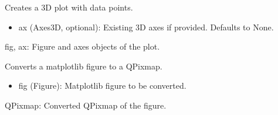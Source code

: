 \documentclass[a4paper,10pt,english]{sphinxmanual}
\begin{document}
\begin{fulllineitems}
\begin{description}
\begin{itemize}
\end{itemize}

\end{description}

\begin{fulllineitems}
\label{\detokenize{utils:src.utils.plane3D_plot.Plane3DPlotter.create_3D_plot}}
\pysigstartsignatures
{}
\pysigstopsignatures
\sphinxAtStartPar
Creates a 3D plot with data points.
\begin{description}
\begin{itemize}
\item {} 
\sphinxAtStartPar
ax (Axes3D, optional): Existing 3D axes if provided. Defaults to None.

\end{itemize}

\sphinxAtStartPar
fig, ax: Figure and axes objects of the plot.

\end{description}

\end{fulllineitems}


\begin{fulllineitems}
\label{\detokenize{utils:src.utils.plane3D_plot.Plane3DPlotter.fig_to_pixmap}}
\pysigstartsignatures
{}
\pysigstopsignatures
\sphinxAtStartPar
Converts a matplotlib figure to a QPixmap.
\begin{description}
\begin{itemize}
\item {} 
\sphinxAtStartPar
fig (Figure): Matplotlib figure to be converted.

\end{itemize}

\sphinxAtStartPar
QPixmap: Converted QPixmap of the figure.

\end{description}


\end{fulllineitems}
\end{fulllineitems}
\end{document}
